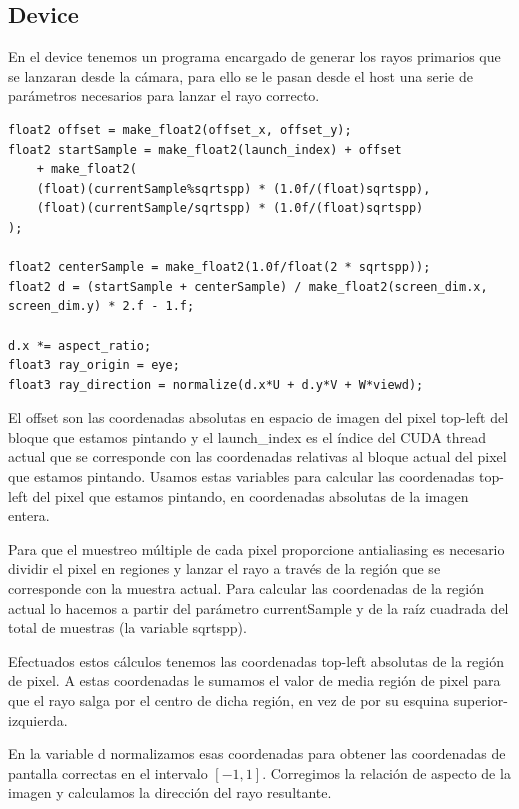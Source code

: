 \clearpage

\subsection{Device}

En el device tenemos un programa encargado de generar los rayos primarios que se lanzaran desde la cámara, para ello se le pasan desde el host una serie de parámetros necesarios para lanzar el rayo correcto.

\begin{lstlisting}
float2 offset = make_float2(offset_x, offset_y);
float2 startSample = make_float2(launch_index) + offset 
	+ make_float2(
	(float)(currentSample%sqrtspp) * (1.0f/(float)sqrtspp),
	(float)(currentSample/sqrtspp) * (1.0f/(float)sqrtspp)
);

float2 centerSample = make_float2(1.0f/float(2 * sqrtspp));
float2 d = (startSample + centerSample) / make_float2(screen_dim.x, screen_dim.y) * 2.f - 1.f;

d.x *= aspect_ratio;
float3 ray_origin = eye;
float3 ray_direction = normalize(d.x*U + d.y*V + W*viewd);
\end{lstlisting}

El offset son las coordenadas absolutas en espacio de imagen del pixel top-left del bloque que estamos pintando y el launch\_index es el índice del CUDA thread actual que se corresponde con las coordenadas relativas al bloque actual del pixel que estamos pintando. Usamos estas variables para calcular las coordenadas top-left del pixel que estamos pintando, en coordenadas absolutas de la imagen entera.

\medskip

Para que el muestreo múltiple de cada pixel proporcione antialiasing es necesario dividir el pixel en regiones y lanzar el rayo a través de la región que se corresponde con la muestra actual. Para calcular las coordenadas de la región actual lo hacemos a partir del parámetro currentSample y de la raíz cuadrada del total de muestras (la variable sqrtspp).

\medskip

Efectuados estos cálculos tenemos las coordenadas top-left absolutas de la región de pixel. A estas coordenadas le sumamos el valor de media región de pixel para que el rayo salga por el centro de dicha región, en vez de por su esquina superior-izquierda.

\medskip

En la variable d normalizamos esas coordenadas para obtener las coordenadas de pantalla correctas en el intervalo $[-1, 1]$. Corregimos la relación de aspecto de la imagen y calculamos la dirección del rayo resultante.

